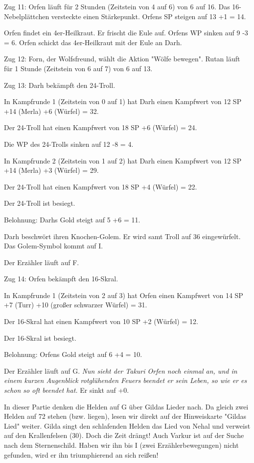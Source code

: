 \documentclass[10pt, a4paper, oneside]{book}
\begin{document}
{Zug 11: Orfen läuft für 2 Stunden (Zeitstein von 4 auf 6) von 6 auf 16. Das 16-Nebelplättchen versteckte einen Stärkepunkt. Orfens SP steigen auf 13 +1 = 14.

Orfen findet ein 4er-Heilkraut. Er frischt die Eule auf. Orfens WP sinken auf 9 -3 = 6. Orfen schickt das 4er-Heilkraut mit der Eule an Darh.



Zug 12: Forn, der Wolfsfreund, wählt die Aktion "Wölfe bewegen". Rutan läuft für 1 Stunde (Zeitstein von 6 auf 7) von 6 auf 13.



Zug 13: Darh bekämpft den 24-Troll.

In Kampfrunde 1 (Zeitstein von 0 auf 1) hat Darh einen Kampfwert von 12 SP +14 (Merla) +6 (Würfel) = 32.

Der 24-Troll hat einen Kampfwert von 18 SP +6 (Würfel) = 24.

Die WP des 24-Trolls sinken auf 12 -8 = 4.

In Kampfrunde 2 (Zeitstein von 1 auf 2) hat Darh einen Kampfwert von 12 SP +14 (Merla) +3 (Würfel) = 29.

Der 24-Troll hat einen Kampfwert von 18 SP +4 (Würfel) = 22.

Der 24-Troll ist besiegt.

Belohnung: Darhs Gold steigt auf 5 +6 = 11.

Darh beschwört ihren Knochen-Golem. Er wird samt Troll auf 36 eingewürfelt. Das Golem-Symbol kommt auf I.

Der Erzähler läuft auf F.



Zug 14: Orfen bekämpft den 16-Skral.

In Kampfrunde 1 (Zeitstein von 2 auf 3) hat Orfen einen Kampfwert von 14 SP +7 (Turr) +10 (großer schwarzer Würfel) = 31.

Der 16-Skral hat einen Kampfwert von 10 SP +2 (Würfel) = 12.

Der 16-Skral ist besiegt.

Belohnung: Orfens Gold steigt auf 6 +4 = 10.

Der Erzähler läuft auf G. \textit{Nun sieht der Takuri Orfen noch einmal an, und in einem kurzen Augenblick rotglühenden Feuers beendet er sein Leben, so wie er es schon so oft beendet hat.} Er sinkt auf +0.

In dieser Partie denken die Helden auf G über Gildas Lieder nach. Da gleich zwei Helden auf 72 stehen (bzw. liegen), lesen wir direkt auf der Hinweiskarte "Gildas Lied" weiter. Gilda singt den schlafenden Helden das Lied von Nehal und verweist auf den Krallenfelsen (30). Doch die Zeit drängt! Auch Varkur ist auf der Suche nach dem Sternenschild. Haben wir ihn bis I (zwei Erzählerbewegungen) nicht gefunden, wird er ihn triumphierend an sich reißen!



}
\end{document}
